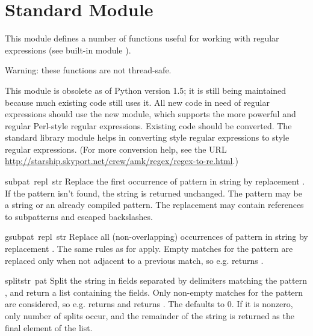 \section{Standard Module }
\label{module-regsub}

This module defines a number of functions useful for working with
regular expressions (see built-in module ).

Warning: these functions are not thread-safe.

This module is obsolete as of Python version 1.5; it is still being
maintained because much existing code still uses it.  All new code in
need of regular expressions should use the new  module, which
supports the more powerful and regular Perl-style regular expressions.
Existing code should be converted.  The standard library module
 helps in converting  style regular
expressions to  style regular expressions.  (For more
conversion help, see the URL
\url{http://starship.skyport.net/crew/amk/regex/regex-to-re.html}.)


\begin{funcdesc}{sub}{pat\, repl\, str}
Replace the first occurrence of pattern  in string
 by replacement .  If the pattern isn't found,
the string is returned unchanged.  The pattern may be a string or an
already compiled pattern.  The replacement may contain references
 to subpatterns and escaped backslashes.
\end{funcdesc}

\begin{funcdesc}{gsub}{pat\, repl\, str}
Replace all (non-overlapping) occurrences of pattern  in
string  by replacement .  The same rules as for
 apply.  Empty matches for the pattern are replaced only
when not adjacent to a previous match, so e.g.
 returns .
\end{funcdesc}

\begin{funcdesc}{split}{str\, pat}
Split the string  in fields separated by delimiters matching
the pattern , and return a list containing the fields.  Only
non-empty matches for the pattern are considered, so e.g.
 returns \code{['a', 'b']} and
 returns \code{['abc']}.  The 
defaults to 0. If it is nonzero, only  number of splits
occur, and the remainder of the string is returned as the final
element of the list.
\end{funcdesc}

